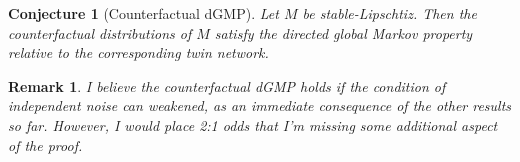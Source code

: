 \documentclass{article}
\newtheorem{conjecture}{Conjecture}
\newtheorem{remark}{Remark}
\begin{document}
\begin{conjecture}[Counterfactual dGMP] \label{thrm:counter}
Let $M$ be stable-Lipschtiz. Then the counterfactual distributions of $M$ satisfy the directed global Markov property relative to the corresponding twin network.
\end{conjecture}

\begin{remark}
I believe the counterfactual dGMP holds if the condition of independent noise can weakened, as an immediate consequence of the other results so far. However, I would place 2:1 odds that I'm missing some additional aspect of the proof.
\end{remark}
\end{document}
